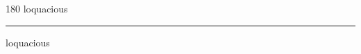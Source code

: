 
\begin{frame}
\begin{center}
\begin{turn}{180}
{\fontsize{2.5cm}{1em}\selectfont loquacious}
\end{turn}
\vspace{1em}\par  
\hrule
\vspace{1em}\par  
{\fontsize{2.5cm}{1em}\selectfont loquacious}
\end{center}
\end{frame}

